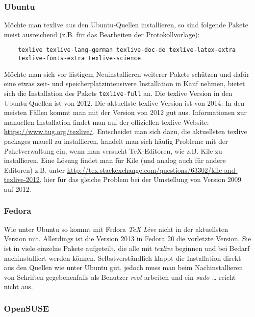 \subsubsection{Ubuntu}
Möchte man texlive aus den Ubuntu-Quellen installieren, so sind folgende Pakete meist ausreichend (z.B. für das Bearbeiten der Protokollvorlage):
\begin{verbatim}
	texlive texlive-lang-german texlive-doc-de texlive-latex-extra
	texlive-fonts-extra texlive-science
\end{verbatim}
Möchte man sich vor lästigem Neuinstallieren weiterer Pakete schützen und dafür eine etwas zeit- und speicherplatzintensivere Installation in Kauf nehmen, bietet sich die Installation des Pakets \verb|texlive-full| an. Die texlive Version in den Ubuntu-Quellen ist von 2012. Die aktuellste texlive Version ist von 2014. In den meisten Fällen kommt man mit der Version von 2012 gut aus. Informationen zur manuellen Installation findet man auf der offiziellen texlive Website: \url{https://www.tug.org/texlive/}. Entscheidet man sich dazu, die aktuellsten texlive packages mauell zu installieren, handelt man sich häufig Probleme mit der Paketverwaltung ein, wenn man versucht TeX-Editoren, wie z.B. Kile zu installieren. Eine Lösung findet man für Kile (und analog auch für andere Editoren) z.B. unter \url{http://tex.stackexchange.com/questions/63302/kile-and-texlive-2012}, hier für das gleiche Problem bei der Umstellung von Version 2009 auf 2012.

\subsubsection{Fedora}
Wie unter Ubuntu so kommt mit Fedora \textit{TeX Live} nicht in der aktuellsten Version mit.
Allerdings ist die Version 2013 in Fedora 20 die vorletzte Version.
Sie ist in viele einzelne Pakete aufgeteilt, die alle mit \textit{texlive} beginnen und bei Bedarf nachinstalliert werden können.
Selbstverständlich klappt die Installation direkt aus den Quellen wie unter Ubuntu gut, jedoch muss man beim Nachinstallieren von Schriften gegebenenfalls als Benutzer \textit{root} arbeiten und ein \textit{sudo \ldots} reicht nicht aus.

\subsubsection{OpenSUSE}
